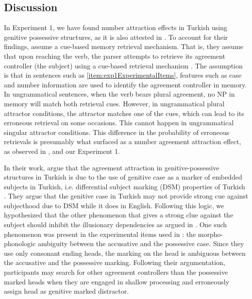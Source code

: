 \documentclass[a4paper,man,natbib]{apa6}\usepackage[]{graphicx}\usepackage[]{color}
\begin{document}
\subsection{Discussion} \label{sec:exp1:discussion}

In Experiment 1, we have found number attraction effects in Turkish using genitive possessive structures, as it is also attested in \citet{LagoEtAl:2018}. To account for their findings, \citet{LagoEtAl:2018} assume a cue-based memory retrieval mechanism. That is, they assume that upon reaching the verb, the parser attempts to retrieve its agreement controller (the subject) using a cue-based retrieval mechanism \citep{LewisVasishth:2005,JagerEngelmannVasishth:2017}. The assumption is that in sentences such as \ref{item:exp1ExperimentalItems}, features such as case and number information are used to identify the agreement controller in memory. In ungrammatical sentences, when the verb bears plural agreement, no NP in memory will match both retrieval cues. However, in ungrammatical plural attractor conditions, the attractor matches one of the cues, which can lead to its erroneous retrieval on some occasions. This cannot happen in ungrammatical singular attractor conditions. This difference in the probability of erroneous retrievals is presumably what surfaced as a number agreement attraction effect, as observed in \citet{LagoEtAl:2018}, and our Experiment 1.

In their work, \citet{LagoEtAl:2018} argue that the agreement attraction in genitive-possessive structures in Turkish is due to the use of genitive case as a marker of embedded subjects in Turkish, i.e. differential subject marking (DSM) properties of Turkish \citep{kornfilt2009dom}. They argue that the genitive case in Turkish may not provide strong cue against subjecthood due to DSM while it does in English. Following this logic, we hypothesized that the other phenomenon that gives a strong clue against the subject should inhibit the illusionary dependencies as argued in \citet{nicol2016minimal}. One such phenomenon was present in the experimental items used in \citet{LagoEtAl:2018}: the morpho-phonologic ambiguity between the accusative and the possessive case. Since they use only consonant ending heads, the marking on the head is ambiguous between the accusative and the possessive marking. Following their argumentation, participants may search for other agreement controllers than the possessive marked heads when they are engaged in shallow processing and erroneously assign head as genitive marked distractor.
\end{document}
